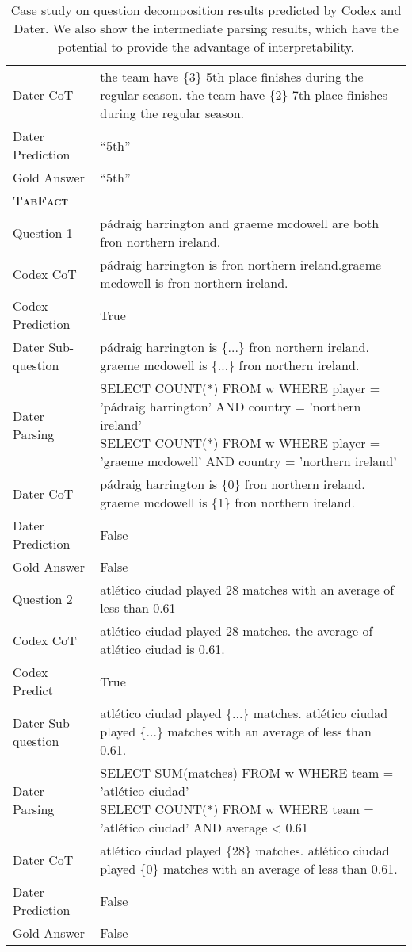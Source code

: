 \documentclass{article}
\newcommand{\cmark}{\ding{51}}
\newcommand{\xmark}{\ding{55}}
\newcommand{\sqlcorrect}[1]{{\color{olive}{\cmark}}}
\newcommand{\sqlwrong}[1]{{\color{red}{\xmark}}}
\begin{document}
\begin{table*}[h]
{\begin{tabular}{ll}
    Dater CoT  &  the team have \{3\} 5th place finishes during the regular season. the team have \{2\} 7th place finishes during the regular season. \\
    Dater Prediction  &   ``5th'' \sqlcorrect{} \\
    Gold  Answer  &   ``5th''\\
    \midrule
    \rowcolor[RGB]{240,248,255} \textsc{\textbf{TabFact}}  &  \\
    \midrule
    Question 1   & pádraig harrington and graeme mcdowell are both fron northern ireland.   \\
    Codex CoT  &  pádraig harrington is fron northern ireland.graeme mcdowell is fron northern ireland. \\
    Codex Prediction &  True \sqlwrong{} \\
Dater Sub-question  &  pádraig harrington is \{...\} fron northern ireland. graeme mcdowell is \{...\} fron northern ireland. \\
    Dater Parsing & \makecell[l]{
    SELECT COUNT(*) FROM w WHERE player = 'pádraig harrington' AND country = 'northern ireland'\\
    SELECT COUNT(*) FROM w WHERE player = 'graeme mcdowell' AND country = 'northern ireland'}\\
    Dater CoT  &  pádraig harrington is \{0\} fron northern ireland. graeme mcdowell is \{1\} fron northern ireland. \\
    Dater Prediction &  False \sqlcorrect{} \\

    Gold Answer   &  False \\
    \midrule
    Question 2 & atlético ciudad played 28 matches with an average of less than 0.61 
    \\

    Codex CoT  & atlético ciudad played 28 matches. the average of atlético ciudad is 0.61.  \\
    Codex Predict   &   True \sqlwrong{}    \\
Dater Sub-question  &   atlético ciudad played \{...\} matches. atlético ciudad played \{...\} matches with an average of less than 0.61.\\
    Dater Parsing &  \makecell[l]{SELECT SUM(matches) FROM w WHERE team = 'atlético ciudad'\\SELECT COUNT(*) FROM w WHERE team = 'atlético ciudad' AND average < 0.61 }     \\
    Dater CoT  &   atlético ciudad played \{28\} matches. atlético ciudad played \{0\} matches with an average of less than 0.61.\\
    Dater Prediction & False  \sqlcorrect{} \\
    Gold Answer   & False \\
    \bottomrule
  \end{tabular}}
  \caption{
  Case study on question decomposition results predicted by Codex and Dater. We also show the intermediate parsing results, which have the potential to provide the advantage of interpretability.
  }
  \label{tab:cs_cot}
\end{table*}
\end{document}
